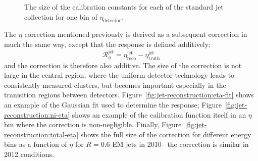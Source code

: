 

\begin{figure}
\centering
{}
\label{fig:jet-reconstruction:total_jes}
\caption{The size of the calibration constants for each of the standard jet collection for one bin of $\eta_\mathrm{detector}$.}
\end{figure}


The $\eta$ correction mentioned previously is derived as a subsequent correction in much the same way, except that the response is defined additively:
%
\begin{equation}
\mathcal{R}_\eta^\mathrm{jet} = \eta^{\mathrm{jet}}_{\mathrm{reco}} -  \eta^{\mathrm{jet}}_{\mathrm{truth}} 
\end{equation}
%
and the correction is therefore also additive. The size of the correction is not large in the central region, where the uniform detector technology leads to consistently measured clusters, but becomes important especially in the tranisition regions between detectors. Figure~\ref{fig:jet-reconstruction:eta-fit} shows an example of the Gaussian fit used to determine the response; Figure~\ref{fig:jet-reconstruction:ni-eta} shows an example of the calibration function itself in an $\eta$ bin where the correction is non-negligible. Finally, Figure~\ref{fig:jet-reconstruction:total-eta} shows the full size of the correction for different energy bins as a function of $\eta$ for $R=0.6$ EM jets in 2010-- the correction is similar in 2012 conditions.

